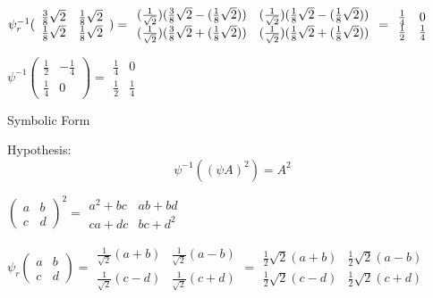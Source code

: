 \documentclass[11pt]{article}
\begin{document}
$\psi _{r}^{-1}(\allowbreak 
\begin{array}{cc}
\frac{3}{8}\sqrt{2} & \frac{1}{8}\sqrt{2} \\ 
\frac{1}{8}\sqrt{2} & \frac{1}{8}\sqrt{2}
\end{array}
)=
\begin{array}{cc}
(\frac{1}{\sqrt{2}})(\frac{3}{8}\sqrt{2}-(\frac{1}{8}\sqrt{2})) & (\frac{1}{%
\sqrt{2}})(\frac{1}{8}\sqrt{2}-(\frac{1}{8}\sqrt{2})) \\ 
(\frac{1}{\sqrt{2}})(\frac{3}{8}\sqrt{2}+(\frac{1}{8}\sqrt{2})) & (\frac{1}{%
\sqrt{2}})(\frac{1}{8}\sqrt{2}+(\frac{1}{8}\sqrt{2}))
\end{array}
=\allowbreak 
\begin{array}{cc}
\frac{1}{4} & 0 \\ 
\frac{1}{2} & \frac{1}{4}
\end{array}
$

$\psi ^{-1}(\allowbreak 
\begin{array}{cc}
\frac{1}{2} & -\frac{1}{4} \\ 
\frac{1}{4} & 0
\end{array}
)=\allowbreak 
\begin{array}{cc}
\frac{1}{4} & 0 \\ 
\frac{1}{2} & \frac{1}{4}
\end{array}
$

Symbolic Form 


Hypothesis:  
\[ \psi^{-1} ((\psi{A})^2) = A^2 \]



$(
\begin{array}{cc}
a & b \\ 
c & d
\end{array}
)^{2}=\allowbreak 
\begin{array}{cc}
a^{2}+bc & ab+bd \\ 
ca+dc & bc+d^{2}
\end{array}
$

$\psi _{r}(
\begin{array}{cc}
a & b \\ 
c & d
\end{array}
)=
\begin{array}{cc}
\frac{1}{\sqrt{2}}(a+b) & \frac{1}{\sqrt{2}}(a-b) \\ 
\frac{1}{\sqrt{2}}(c-d) & \frac{1}{\sqrt{2}}(c+d)
\end{array}
=\allowbreak 
\begin{array}{cc}
\frac{1}{2}\sqrt{2}\left( a+b\right)  & \frac{1}{2}\sqrt{2}\left( a-b\right) 
\\ 
\frac{1}{2}\sqrt{2}\left( c-d\right)  & \frac{1}{2}\sqrt{2}\left( c+d\right) 
\end{array}
\allowbreak $
\end{document}
